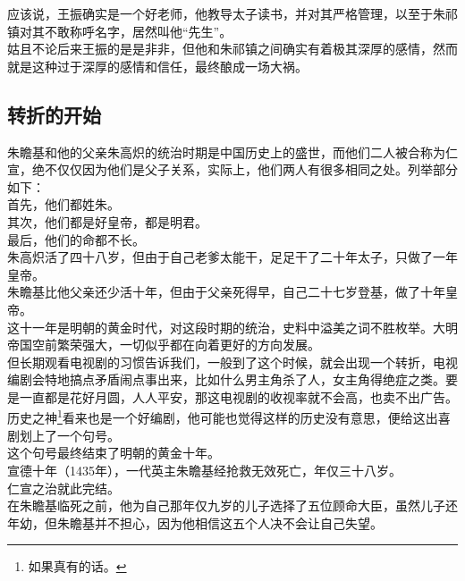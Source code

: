 \begin{multicols}{\theparacolNo}
应该说，王振确实是一个好老师，他教导太子读书，并对其严格管理，以至于朱祁镇对其不敢称呼名字，居然叫他“先生”。\\

姑且不论后来王振的是是非非，但他和朱祁镇之间确实有着极其深厚的感情，然而就是这种过于深厚的感情和信任，最终酿成一场大祸。\\

\subsection{转折的开始}
朱瞻基和他的父亲朱高炽的统治时期是中国历史上的盛世，而他们二人被合称为仁宣，绝不仅仅因为他们是父子关系，实际上，他们两人有很多相同之处。列举部分如下：\\

首先，他们都姓朱。\\

其次，他们都是好皇帝，都是明君。\\

最后，他们的命都不长。\\

朱高炽活了四十八岁，但由于自己老爹太能干，足足干了二十年太子，只做了一年皇帝。\\

朱瞻基比他父亲还少活十年，但由于父亲死得早，自己二十七岁登基，做了十年皇帝。\\

这十一年是明朝的黄金时代，对这段时期的统治，史料中溢美之词不胜枚举。大明帝国空前繁荣强大，一切似乎都在向着更好的方向发展。\\

但长期观看电视剧的习惯告诉我们，一般到了这个时候，就会出现一个转折，电视编剧会特地搞点矛盾闹点事出来，比如什么男主角杀了人，女主角得绝症之类。要是一直都是花好月圆，人人平安，那这电视剧的收视率就不会高，也卖不出广告。\\

历史之神\footnote{如果真有的话。}看来也是一个好编剧，他可能也觉得这样的历史没有意思，便给这出喜剧划上了一个句号。\\

这个句号最终结束了明朝的黄金十年。\\

宣德十年（1435年），一代英主朱瞻基经抢救无效死亡，年仅三十八岁。\\

仁宣之治就此完结。\\

在朱瞻基临死之前，他为自己那年仅九岁的儿子选择了五位顾命大臣，虽然儿子还年幼，但朱瞻基并不担心，因为他相信这五个人决不会让自己失望。\\


\end{multicols}
